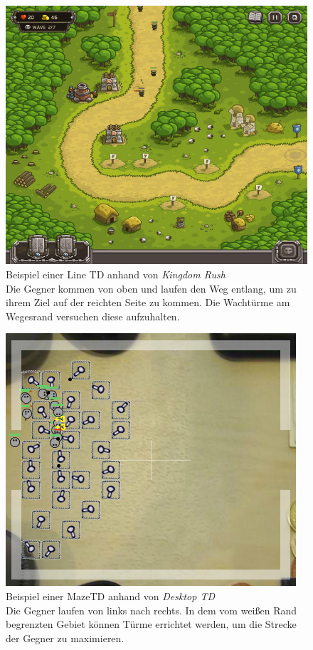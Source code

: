 \newpage
\begin{figure} [t]
\centering
\includegraphics[width=0.67\linewidth]{./images/Kapitel_PrototypKonzept/LaneTDSample_KingdomRush.png}
\caption[Beispiel einer Line TD]{Beispiel einer Line TD anhand von \textit{Kingdom Rush}\\
Die Gegner kommen von oben und laufen den Weg entlang, um zu ihrem Ziel auf der reichten Seite zu kommen. Die Wachtürme am Wegesrand versuchen diese aufzuhalten.}
\label{fig:LaneTDSample_KingdomRush}
\end{figure}
\begin{figure}[b]
\centering
\includegraphics[width=0.67\linewidth]{./images/Kapitel_PrototypKonzept/MazeTDSample_DesktopTD.png}
\caption[Beispiel einer Maze TD]{Beispiel einer MazeTD anhand von \textit{Desktop TD}\\
Die Gegner laufen von links nach rechts. In dem vom weißen Rand begrenzten Gebiet können Türme errichtet werden, um die Strecke der Gegner zu maximieren.}
\label{fig:MazeTDSample_DesktopTD}
\end{figure}
\clearpage

